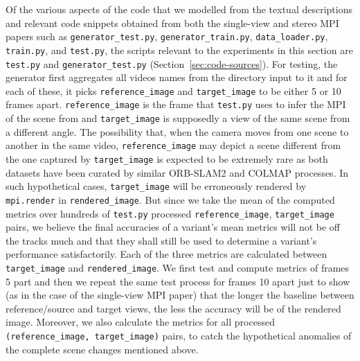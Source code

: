 Of the various aspects of the code that we modelled from the textual descriptions and relevant code snippets obtained from both the single-view and stereo MPI papers such as \texttt{generator\_test.py}, \texttt{generator\_train.py}, \texttt{data\_loader.py}, \texttt{train.py}, and \texttt{test.py}, the scripts relevant to the experiments in this section are \texttt{test.py} and \texttt{generator\_test.py} (Section~\ref{sec:code-sources}). For testing, the generator first aggregates all videos names from the directory input to it and for each of these, it picks \texttt{reference\_image} and \texttt{target\_image} to be either 5 or 10 frames apart. \texttt{reference\_image} is the frame that \texttt{test.py} uses to infer the MPI of the scene from and \texttt{target\_image} is supposedly a view of the same scene from a different angle. The possibility that, when the camera moves from one scene to another in the same video, \texttt{reference\_image} may depict a scene different from the one captured by \texttt{target\_image} is expected to be extremely rare as both datasets have been curated by similar ORB-SLAM2 and COLMAP processes. In such hypothetical cases, \texttt{target\_image} will be erroneously rendered by \texttt{mpi.render} in \texttt{rendered\_image}. But since we take the mean of the computed metrics over hundreds of \texttt{test.py} processed \texttt{reference\_image}, \texttt{target\_image} pairs, we believe the final accuracies of a variant's mean metrics will not be off the tracks much and that they shall still be used to determine a variant’s performance satisfactorily. Each of the three metrics are calculated between \texttt{target\_image} and \texttt{rendered\_image}. We first test and compute metrics of frames 5 part and then we repeat the same test process for frames 10 apart just to show (as in the case of the single-view MPI paper) that the longer the baseline between reference/source and target views, the less the accuracy will be of the rendered image. Moreover, we also calculate the metrics for all processed \texttt{(reference\_image, target\_image)} pairs, to catch the hypothetical anomalies of the complete scene changes mentioned above. 

